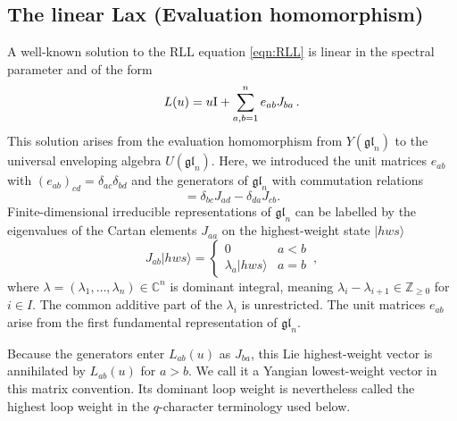 \documentclass[12pt,reqno]{amsart}
\newcommand{\C}{{\mathbb C}}
\newcommand{\Z}{{\mathbb Z}}
\newcommand{\id}{{\rm I}}
\numberwithin{equation}{section}
\begin{document}
		\subsection{The linear Lax (Evaluation homomorphism)}
        \label{subsec:eval_conventions}
		A well-known solution to the RLL equation \eqref{eqn:RLL} is linear in the spectral parameter and of the form
	\begin{equation}
		L(u)=u\id+\sum_{a,b=1}^n e_{ab}J_{ba}\,.
        \label{eqn:lin_Lax}
	\end{equation}
This solution arises from the evaluation homomorphism from $Y(\mathfrak{gl}_n)$ to the universal enveloping algebra $U(\mathfrak{gl}_n)$. Here, we introduced the unit matrices $e_{ab}$ with $(e_{ab})_{cd}=\delta_{ac}\delta_{bd}$ and the generators of $\mathfrak{gl}_n$   with commutation relations
	\begin{equation}
		[J_{ab},J_{cd}]=\delta_{bc}J_{ad}-\delta_{da}J_{cb}.
	\end{equation}
	Finite-dimensional irreducible representations of $\mathfrak{gl}_n$ can be labelled by the eigenvalues of the Cartan elements $J_{aa}$ on the highest-weight state $|hws\rangle$
	\begin{equation}
	J_{ab}|hws\rangle =\begin{cases}
	  0 &a<b\\
	  \lambda_a |hws\rangle  & a=b
	 \end{cases}\,,
	\end{equation}
	where $\lambda=(\lambda_1,\ldots,\lambda_n)\in\C^n$ is dominant integral,
    meaning $\lambda_i-\lambda_{i+1}\in\Z_{\geq0}$ for $i\in I$.
    The common additive part of the $\lambda_i$ is unrestricted. The unit
    matrices $e_{ab}$ arise from the first fundamental representation of
    $\mathfrak{gl}_n$.

    Because the generators enter $L_{ab}(u)$ as $J_{ba}$, this Lie
    highest-weight vector is annihilated by $L_{ab}(u)$ for $a>b$.
    We call it a Yangian lowest-weight vector in this matrix convention.
    Its dominant loop weight is nevertheless called the highest loop
    weight in the $q$-character terminology used below.
\end{document}
